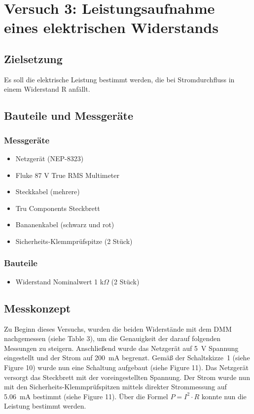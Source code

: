 \documentclass[a4paper,12pt]{article}
\begin{document}
\newpage
\section{Versuch 3: Leistungsaufnahme eines elektrischen Widerstands}
\subsection{Zielsetzung}
Es soll die elektrische Leistung bestimmt werden, die bei Stromdurchfluss in
einem Widerstand R anfällt.

\subsection{Bauteile und Messgeräte}
\subsubsection*{Messgeräte}
\begin{itemize}
\item Netzgerät (NEP-8323)
\item Fluke 87 V True RMS Multimeter
\item Steckkabel (mehrere)
\item Tru Components Steckbrett
\item Bananenkabel (schwarz und rot)
\item Sicherheits-Klemmprüfspitze (2 Stück)
\end{itemize}

\subsubsection*{Bauteile}
\begin{itemize}
\item Widerstand Nominalwert 1 k$\Omega$ (2 Stück)
\end{itemize}





\subsection{Messkonzept}
Zu Beginn dieses Versuchs, wurden die beiden Widerstände mit dem DMM nachgemessen (siehe Table 3), um die Genauigkeit der darauf folgenden Messungen zu steigern. Anschließend wurde das Netzgerät auf 5~V Spannung eingestellt und der Strom auf 200~mA begrenzt. Gemäß der Schaltskizze~1 (siehe Figure 10) wurde nun eine Schaltung aufgebaut (siehe Figure 11). Das Netzgerät versorgt das Steckbrett mit der voreingestellten Spannung. Der Strom wurde nun mit den Sicherheits-Klemmprüfspitzen mittels direkter Strommessung auf 5.06~mA bestimmt (siehe Figure 11). Über die Formel \(P = I^2 \cdot R \) konnte nun die Leistung bestimmt werden.
\end{document}
